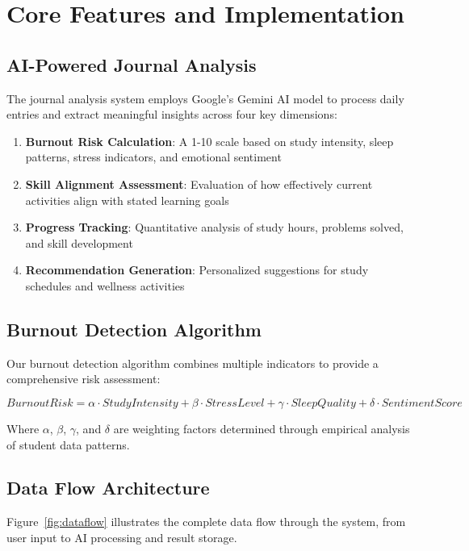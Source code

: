 \documentclass[conference,10pt]{IEEEtran}
\begin{document}
\section{Core Features and Implementation}

\subsection{AI-Powered Journal Analysis}

The journal analysis system employs Google's Gemini AI model to process daily entries and extract meaningful insights across four key dimensions:

\begin{enumerate}
\item \textbf{Burnout Risk Calculation}: A 1-10 scale based on study intensity, sleep patterns, stress indicators, and emotional sentiment
\item \textbf{Skill Alignment Assessment}: Evaluation of how effectively current activities align with stated learning goals
\item \textbf{Progress Tracking}: Quantitative analysis of study hours, problems solved, and skill development
\item \textbf{Recommendation Generation}: Personalized suggestions for study schedules and wellness activities
\end{enumerate}

\subsection{Burnout Detection Algorithm}

Our burnout detection algorithm combines multiple indicators to provide a comprehensive risk assessment:

\begin{equation}
BurnoutRisk = \alpha \cdot StudyIntensity + \beta \cdot StressLevel + \gamma \cdot SleepQuality + \delta \cdot SentimentScore
\end{equation}

Where $\alpha$, $\beta$, $\gamma$, and $\delta$ are weighting factors determined through empirical analysis of student data patterns.

\subsection{Data Flow Architecture}

Figure~\ref{fig:dataflow} illustrates the complete data flow through the system, from user input to AI processing and result storage.
\end{document}
